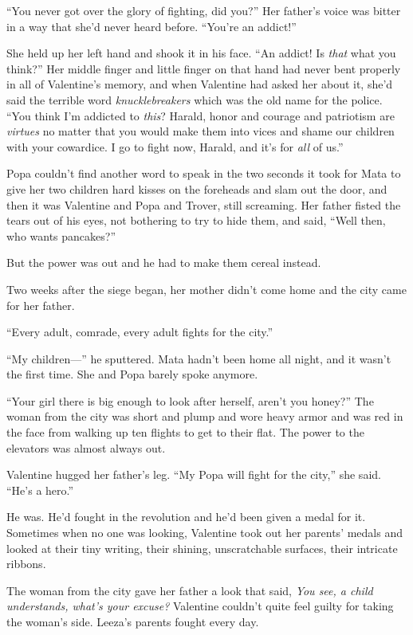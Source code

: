 “You never got over the glory of fighting, did you?” Her father’s
voice was bitter in a way that she’d never heard before. “You’re an
addict!”

She held up her left hand and shook it in his face. “An addict! Is
\emph{that} what you think?” Her middle finger and little finger on
that hand had never bent properly in all of Valentine’s memory, and
when Valentine had asked her about it, she’d said the terrible word
\emph{knucklebreakers} which was the old name for the police. “You
think I’m addicted to \emph{this}? Harald, honor and courage and
patriotism are \emph{virtues} no matter that you would make them
into vices and shame our children with your cowardice. I go to
fight now, Harald, and it’s for \emph{all} of us.”

Popa couldn’t find another word to speak in the two seconds it took
for Mata to give her two children hard kisses on the foreheads and
slam out the door, and then it was Valentine and Popa and Trover,
still screaming. Her father fisted the tears out of his eyes, not
bothering to try to hide them, and said, “Well then, who wants
pancakes?”

But the power was out and he had to make them cereal instead.

\tb

Two weeks after the siege began, her mother didn’t come home and
the city came for her father.

“Every adult, comrade, every adult fights for the city.”

“My children---” he sputtered. Mata hadn’t been home all night, and
it wasn’t the first time. She and Popa barely spoke anymore.

“Your girl there is big enough to look after herself, aren’t you
honey?” The woman from the city was short and plump and wore heavy
armor and was red in the face from walking up ten flights to get to
their flat. The power to the elevators was almost always out.

Valentine hugged her father’s leg. “My Popa will fight for the
city,” she said. “He’s a hero.”

He was. He’d fought in the revolution and he’d been given a medal
for it. Sometimes when no one was looking, Valentine took out her
parents’ medals and looked at their tiny writing, their shining,
unscratchable surfaces, their intricate ribbons.

The woman from the city gave her father a look that said,
\emph{You see, a child understands, what’s your excuse?} Valentine
couldn’t quite feel guilty for taking the woman’s side. Leeza’s
parents fought every day.

